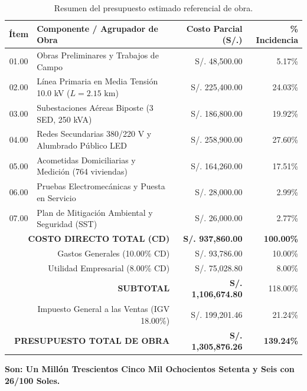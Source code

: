 \begin{table}[H]
\centering
\small
\begin{tabular}{|c|l|r|r|}
\hline
\textbf{Ítem} & \textbf{Componente / Agrupador de Obra} & \textbf{Costo Parcial (S/.)} & \textbf{\% Incidencia} \\
\hline
01.00 & Obras Preliminares y Trabajos de Campo & S/. 48,500.00 & 5.17\% \\
02.00 & Línea Primaria en Media Tensión 10.0 kV ($L = 2.15\text{ km}$) & S/. 225,400.00 & 24.03\% \\
03.00 & Subestaciones Aéreas Biposte (3 SED, 250 kVA) & S/. 186,800.00 & 19.92\% \\
04.00 & Redes Secundarias 380/220 V y Alumbrado Público LED & S/. 258,900.00 & 27.60\% \\
05.00 & Acometidas Domiciliarias y Medición (764 viviendas) & S/. 164,260.00 & 17.51\% \\
06.00 & Pruebas Electromecánicas y Puesta en Servicio & S/. 28,000.00 & 2.99\% \\
07.00 & Plan de Mitigación Ambiental y Seguridad (SST) & S/. 26,000.00 & 2.77\% \\
\hline
\hline
\multicolumn{2}{|r|}{\textbf{COSTO DIRECTO TOTAL (CD)}} & \textbf{S/. 937,860.00} & \textbf{100.00\%} \\
\hline
\multicolumn{2}{|r|}{Gastos Generales (10.00\% CD)} & S/. 93,786.00 & 10.00\% \\
\multicolumn{2}{|r|}{Utilidad Empresarial (8.00\% CD)} & S/. 75,028.80 & 8.00\% \\
\hline
\multicolumn{2}{|r|}{\textbf{SUBTOTAL}} & \textbf{S/. 1,106,674.80} & 118.00\% \\
\hline
\multicolumn{2}{|r|}{Impuesto General a las Ventas (IGV 18.00\%)} & S/. 199,201.46 & 21.24\% \\
\hline
\hline
\multicolumn{2}{|r|}{\textbf{PRESUPUESTO TOTAL DE OBRA}} & \textbf{S/. 1,305,876.26} & \textbf{139.24\%} \\
\hline
\end{tabular}
\caption{Resumen del presupuesto estimado referencial de obra.}
\end{table}

\textbf{Son: Un Millón Trescientos Cinco Mil Ochocientos Setenta y Seis con 26/100 Soles.}
